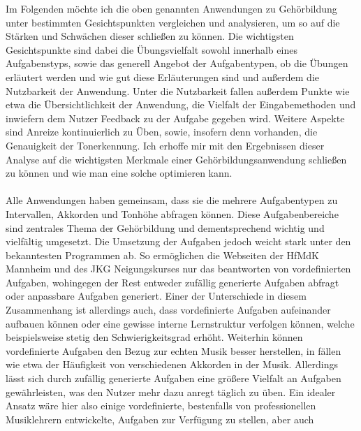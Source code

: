 %


Im Folgenden möchte ich die oben genannten Anwendungen zu Gehörbildung unter bestimmten Gesichtspunkten vergleichen und analysieren, um so auf die Stärken und Schwächen dieser schließen zu können. Die wichtigsten Gesichtspunkte sind dabei
die Übungsvielfalt sowohl innerhalb eines Aufgabenstyps, sowie das generell Angebot der Aufgabentypen, ob die Übungen erläutert werden und wie gut diese Erläuterungen sind und außerdem die Nutzbarkeit der Anwendung. Unter die Nutzbarkeit fallen 
außerdem Punkte wie etwa die Übersichtlichkeit der Anwendung, die Vielfalt der Eingabemethoden und inwiefern dem Nutzer Feedback zu der Aufgabe gegeben wird. Weitere Aspekte sind Anreize kontinuierlich zu Üben, sowie, insofern denn vorhanden, die Genauigkeit der Tonerkennung.
Ich erhoffe mir mit den Ergebnissen dieser Analyse auf die wichtigsten Merkmale einer Gehörbildungsanwendung schließen zu können und wie man eine solche optimieren kann. \\\\
Alle Anwendungen haben gemeinsam, dass sie die mehrere Aufgabentypen zu Intervallen, Akkorden und Tonhöhe abfragen können. Diese Aufgabenbereiche sind zentrales Thema der Gehörbildung und dementsprechend wichtig und vielfältig umgesetzt. 
Die Umsetzung der Aufgaben jedoch weicht stark unter den bekanntesten Programmen ab. So ermöglichen die Webseiten der HfMdK Mannheim und des JKG Neigungskurses nur das beantworten von vordefinierten Aufgaben, wohingegen der Rest entweder zufällig generierte Aufgaben abfragt oder anpassbare Aufgaben generiert.
Einer der Unterschiede in diesem Zusammenhang ist allerdings auch, dass vordefinierte Aufgaben aufeinander aufbauen können oder eine gewisse interne Lernstruktur verfolgen können, welche beispielsweise stetig den Schwierigkeitsgrad erhöht. Weiterhin können vordefinierte Aufgaben den Bezug zur echten Musik besser herstellen, in fällen wie etwa
der Häufigkeit von verschiedenen Akkorden in der Musik. Allerdings lässt sich durch zufällig generierte Aufgaben eine größere Vielfalt an Aufgaben gewährleisten, was den Nutzer mehr dazu anregt täglich zu üben. Ein idealer Ansatz wäre hier also einige vordefinierte, bestenfalls von professionellen Musiklehrern entwickelte, Aufgaben zur Verfügung zu stellen, aber auch
